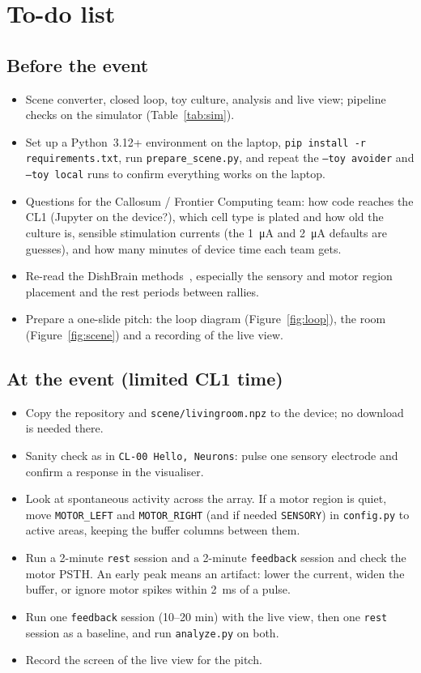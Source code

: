 \documentclass[11pt,a4paper]{article}
\newcommand{\code}[1]{\texttt{#1}}
\newcommand{\todo}{\item[$\square$]}
\newcommand{\done}{\item[$\boxtimes$]}
\begin{document}
\section{To-do list}

\subsection*{Before the event}
\begin{itemize}[leftmargin=2em]
  \done Scene converter, closed loop, toy culture, analysis and live view; pipeline checks
        on the simulator (Table~\ref{tab:sim}).
  \todo Set up a Python~3.12+ environment on the laptop, \code{pip install -r requirements.txt},
        run \code{prepare\_scene.py}, and repeat the \code{--toy avoider} and \code{--toy local}
        runs to confirm everything works on the laptop.
  \todo Questions for the Callosum / Frontier Computing team: how code reaches the CL1
        (Jupyter on the device?), which cell type is plated and how old the culture is, sensible
        stimulation currents (the \SI{1}{\micro\ampere} and \SI{2}{\micro\ampere} defaults are guesses),
        and how many minutes of device time each team gets.
  \todo Re-read the DishBrain methods~\citep{kagan2022dishbrain}, especially the sensory and motor
        region placement and the rest periods between rallies.
  \todo Prepare a one-slide pitch: the loop diagram (Figure~\ref{fig:loop}), the room
        (Figure~\ref{fig:scene}) and a recording of the live view.
\end{itemize}

\subsection*{At the event (limited CL1 time)}
\begin{itemize}[leftmargin=2em]
  \todo Copy the repository and \code{scene/livingroom.npz} to the device; no download is needed there.
  \todo Sanity check as in \code{CL-00 Hello, Neurons}: pulse one sensory electrode and confirm a response
        in the visualiser.
  \todo Look at spontaneous activity across the array. If a motor region is quiet, move
        \code{MOTOR\_LEFT} and \code{MOTOR\_RIGHT} (and if needed \code{SENSORY}) in \code{config.py}
        to active areas, keeping the buffer columns between them.
  \todo Run a 2-minute \code{rest} session and a 2-minute \code{feedback} session and check the
        motor PSTH. An early peak means an artifact: lower the current, widen the buffer, or
        ignore motor spikes within \SI{2}{\milli\second} of a pulse.
  \todo Run one \code{feedback} session (10--20 min) with the live view, then one \code{rest}
        session as a baseline, and run \code{analyze.py} on both.
  \todo Record the screen of the live view for the pitch.
\end{itemize}
\end{document}
